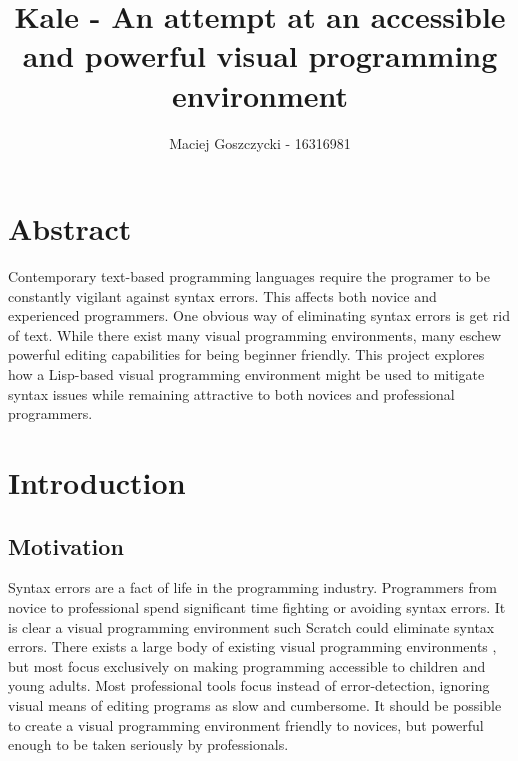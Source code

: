 \documentclass[11pt]{report}
\title{Kale - An attempt at an accessible and powerful visual programming
environment}
\author{Maciej Goszczycki - 16316981}
\date{}
\begin{document}
\maketitle
\tableofcontents
\clearpage

\begingroup
\let\clearpage\relax


\chapter{Abstract}
Contemporary text-based programming languages require the programer to be
constantly vigilant against syntax errors. This affects both novice and
experienced programmers. One obvious way of eliminating syntax errors is
get rid of text. While there exist many visual programming environments, many
eschew powerful editing capabilities for being beginner friendly.
This project explores how a Lisp-based visual programming environment might be
used to mitigate syntax issues while remaining attractive to both novices and
professional programmers.

\chapter{Introduction}

\section{Motivation}
Syntax errors are a fact of life in the programming industry. Programmers from
novice\cite{Denny2011} to professional spend significant time fighting or
avoiding syntax errors. It is clear a visual programming environment such
Scratch could eliminate syntax errors. There exists a large body of existing
visual programming environments \cite{Beldie1983}, but most focus exclusively
on making programming accessible to children and young adults. Most
professional tools focus instead of error-detection, ignoring visual means of
editing programs as slow and cumbersome. It should be possible to create a
visual programming environment friendly to novices, but powerful enough to be
taken seriously by professionals. 
\end{document}
